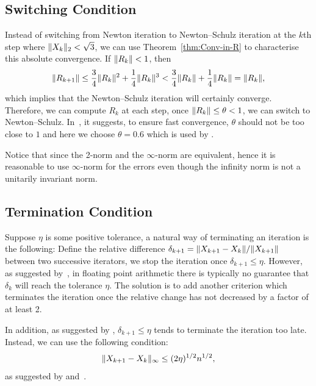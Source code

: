 \documentclass[12pt]{article}
\begin{document}
\subsection{Switching Condition}
Instead of switching from Newton iteration to Newton--Schulz iteration at the $k$th step where $\|{X_k}\|_2 < \sqrt{3}$, we can use Theorem~\ref{thm:Conv-in-R} to characterise this absolute convergence. If $\|{R_{k}}\| < 1$, then 
\begin{equation}
    \notag 
    \|{R_{k+1}}\| \leq \frac{3}{4}\|{R_k}\|^2 + \frac{1}{4}\|{R_k}\|^3 < \frac{3}{4}\|{R_k}\| + \frac{1}{4}\|{R_k}\| = \|{R_k}\|,
\end{equation}
which implies that the Newton--Schulz iteration will certainly converge. Therefore, we can compute $R_{k}$ at each step, once $\|{R_k}\|\leq\theta<1$, we can switch to Newton--Schulz. In~, it suggests, to ensure fast convergence, $\theta$ should not be too close to $1$ and here we choose $\theta = 0.6$ which is used by \cite{hisc90}.

Notice that since the 2-norm and the $\infty$-norm are equivalent, hence it is reasonable to use $\infty$-norm for the errors even though the infinity norm is not a unitarily invariant norm.

\subsection{Termination Condition}
Suppose $\eta$ is some positive tolerance, a natural way of terminating an iteration is the following: Define the relative difference $\delta_{k+1} = \|{X_{k+1} - X_{k}}\|/\|{X_{k+1}}\|$ between two successive iterators, we stop the iteration once $\delta_{k+1} \leq \eta$. However, as suggested by~, in floating point arithmetic there is typically no guarantee that $\delta_k$ will reach the tolerance $\eta$. The solution is to add another criterion which terminates the iteration once the relative change has not decreased by a factor of at least 2.

In addition, as suggested by , $\delta_{k+1}\leq \eta$ tends to terminate the iteration too late. Instead, we can use the following condition:
\begin{equation}
    \notag 
    \|{X_{k+1} - X_{k}}\|_\infty \le (2\eta)^{1/2}n^{1/2},
\end{equation}
as suggested by  and~.
\end{document}
